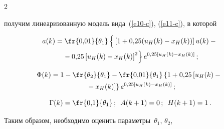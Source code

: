 \begin{multicols}{2}
\begin{equation}
\end{equation}


получим линеаризованную модель вида~(\ref{e10-c}), (\ref{e11-c}), в которой


\begin{multline*}


a(k)=\fr{0{,}01}{\theta_1}\left \{


\vphantom{\left[ u_H(k)-x_H(k)\right]^2}


\vphantom{[x_H(k)]^2}


 \left[ 1+0{,}25(u_H(k)-x_H(k))\right] u(k)-


{}\right.\\


\left.{}-0{,}25\left[ u_H(k)-x_H(k)\right]^2\right \} e^{0{,}25 [u_H(k)-x_H(k)]}\,;


\end{multline*}





\vspace*{-12pt}





\noindent


\begin{multline*}


\Phi(k)=1-\fr{\theta_2}{\theta_1}-\fr{0{,}01}{\theta_1}\left\{1+0{,}25\left[u_H(k)-{}\right.\right.\\


\left.\left.{}-x_H(k)\right]\right\} e^{0{,}25[u_H(k)-x_H(k)]}\,;


\end{multline*}





\vspace*{-6pt}





\noindent


\begin{equation*}


\Gamma(k) = \fr{0{,}1}{\theta_1}\,; \enskip A(k+1)= 0\,;\enskip


H(k+1)=1\,.


\end{equation*}





  Таким образом, необходимо оценить па\-ра\-мет\-ры~$\theta_1$, $\theta_2$,



\end{multicols}
